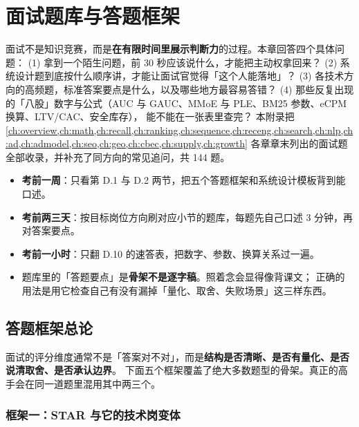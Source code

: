 \chapter{面试题库与答题框架}
\label{app:interview}

\begin{insight}[本章要解决的问题]
面试不是知识竞赛，而是\textbf{在有限时间里展示判断力}的过程。本章回答四个具体问题：
(1) 拿到一个陌生问题，前 30 秒应该说什么，才能把主动权拿回来？
(2) 系统设计题到底按什么顺序讲，才能让面试官觉得「这个人能落地」？
(3) 各技术方向的高频题，标准答案要点是什么，以及哪些地方最容易答错？
(4) 那些反复出现的「八股」数字与公式（AUC 与 GAUC、MMoE 与 PLE、BM25 参数、eCPM 换算、LTV/CAC、安全库存），
    能不能在一张表里查完？
本附录把 \cref{ch:overview,ch:math,ch:recall,ch:ranking,ch:sequence,ch:receng,ch:search,ch:nlp,ch:ad,ch:admodel,ch:seo,ch:geo,ch:cbec,ch:supply,ch:growth}
各章章末列出的面试题全部收录，并补充了同方向的常见追问，共 144 题。
\end{insight}

\begin{toolbox}[怎么用这一章]
\begin{itemize}
  \item \textbf{考前一周}：只看第 D.1 与 D.2 两节，把五个答题框架和系统设计模板背到能口述。
  \item \textbf{考前两三天}：按目标岗位方向刷对应小节的题库，每题先自己口述 3 分钟，再对答案要点。
  \item \textbf{考前一小时}：只翻 D.10 的速答表，把数字、参数、换算关系过一遍。
  \item 题库里的「答题要点」是\textbf{骨架不是逐字稿}。照着念会显得像背课文；
        正确的用法是用它检查自己有没有漏掉「量化、取舍、失败场景」这三样东西。
\end{itemize}
\end{toolbox}

\section{答题框架总论}

面试的评分维度通常不是「答案对不对」，而是\textbf{结构是否清晰、是否有量化、是否说清取舍、是否承认边界}。
下面五个框架覆盖了绝大多数题型的骨架。真正的高手会在同一道题里混用其中两三个。

\subsection{框架一：STAR 与它的技术岗变体}

